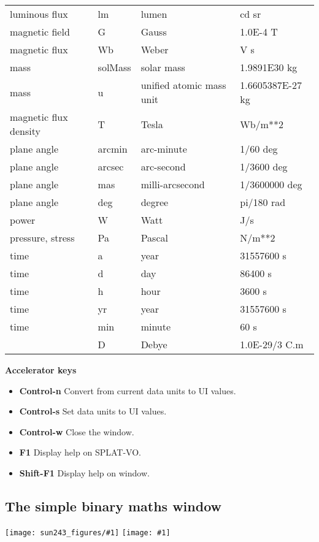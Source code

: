 \documentclass[twoside,11pt,nolof]{starlink}
\providecommand{\SPLAT}{\textsf{SPLAT-VO}}
\providecommand{\mainfigure}[1]
{\begin{center}
    \ifpdf
    \texttt{[image: sun243\_figures/\#1]}
    \else
    \texttt{[image: \#1]}
    \fi
 \end{center}
}
\newcommand{\labelitem}[1]{\textbf{#1}}
\providecommand{\subheading}[1]{\textbf{\large{#1}}}
\begin{document}
\begin{center}
\begin{tabular}{|l|l|l|l|}
luminous flux & lm & lumen & cd sr \\
magnetic field & G & Gauss & 1.0E-4 T \\
magnetic flux & Wb & Weber & V s \\
mass & solMass & solar mass & 1.9891E30 kg \\
mass & u & unified atomic mass unit & 1.6605387E-27 kg \\
magnetic flux density & T & Tesla & Wb/m**2 \\
plane angle  & arcmin & arc-minute & 1/60 deg \\
plane angle  & arcsec & arc-second & 1/3600 deg \\
plane angle  & mas & milli-arcsecond & 1/3600000 deg \\
plane angle & deg & degree & pi/180 rad \\
power & W & Watt & J/s \\
pressure, stress & Pa & Pascal & N/m**2 \\
time  & a & year & 31557600 s \\
time  & d & day & 86400 s \\
time  & h & hour & 3600 s \\
time  & yr & year & 31557600 s \\
time  & min & minute & 60 s \\
      & D & Debye & 1.0E-29/3 C.m \\
\hline
\end{tabular}
\end{center}

\subheading{Accelerator keys}

\begin{itemize}
\item \labelitem{Control-n} Convert from current data units to UI values.
\item \labelitem{Control-s} Set data units to UI values.
\item \labelitem{Control-w} Close the window.
\item \labelitem{F1} Display help on \SPLAT.
\item \labelitem{Shift-F1} Display help on window.
\end{itemize}


\newpage
\subsection{The simple binary maths window}

\mainfigure{binarymathwindow}
\end{document}
